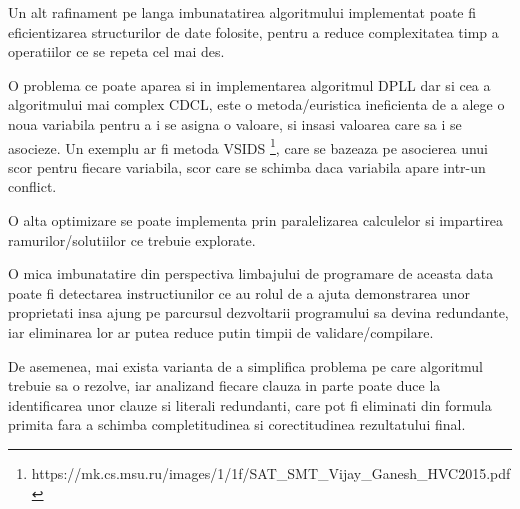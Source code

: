 Un alt rafinament pe langa imbunatatirea algoritmului implementat poate fi eficientizarea structurilor de date folosite, pentru a reduce complexitatea timp a operatiilor ce se repeta cel mai des.

O problema ce poate aparea si in implementarea algoritmul DPLL dar si cea a algoritmului mai complex CDCL, este o metoda/euristica ineficienta de a alege o noua variabila pentru a i se asigna o valoare, si insasi valoarea care sa i se asocieze. Un exemplu ar fi metoda VSIDS 
\footnote{https://mk.cs.msu.ru/images/1/1f/SAT\_SMT\_Vijay\_Ganesh\_HVC2015.pdf}, care se bazeaza pe asocierea unui scor pentru fiecare variabila, scor care se schimba daca variabila apare intr-un conflict. 

O alta optimizare se poate implementa prin paralelizarea calculelor si impartirea ramurilor/solutiilor ce trebuie explorate.

\newpage

O mica imbunatatire din perspectiva limbajului de programare de aceasta data poate fi detectarea instructiunilor ce au rolul de a ajuta demonstrarea unor proprietati insa ajung pe parcursul dezvoltarii programului sa devina redundante, iar eliminarea lor ar putea reduce putin timpii de validare/compilare.

De asemenea, mai exista varianta de a simplifica problema pe care algoritmul trebuie sa o rezolve, iar analizand fiecare clauza in parte poate duce la identificarea unor clauze si literali redundanti, care pot fi eliminati din formula primita fara a schimba completitudinea si corectitudinea rezultatului final.
